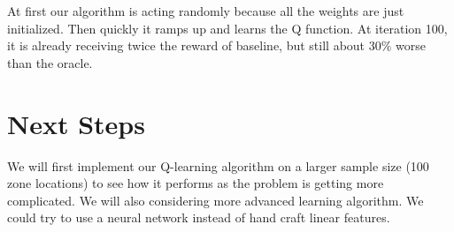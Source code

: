 \documentclass{article}
\begin{document}
At first our algorithm is acting randomly because all the weights are just initialized. Then quickly it ramps up and learns the Q function. At iteration 100, it is already receiving twice the reward of baseline, but still about $30\%$ worse than the oracle.

\section{Next Steps}
We will first implement our Q-learning algorithm on a larger sample size (100 zone locations) to see how it performs as the problem is getting more complicated. We will also considering more advanced learning algorithm. We could try to use a neural network instead of hand craft linear features.
\end{document}
